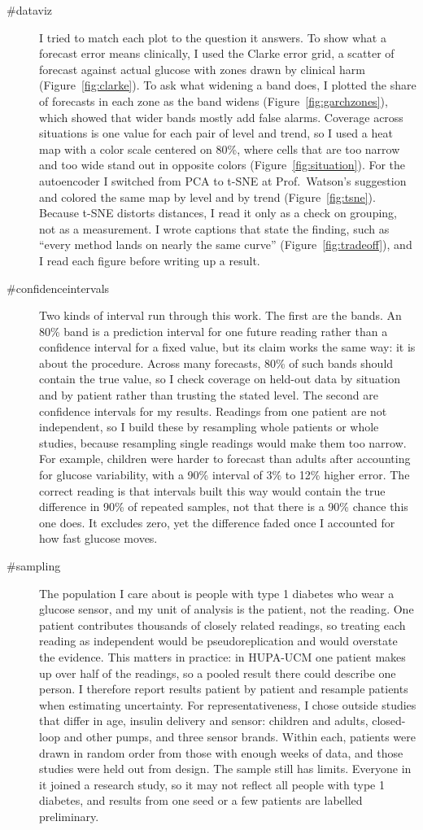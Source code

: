 \begin{description}
\item[\#dataviz] I tried to match each plot to the question it answers. To show what a forecast error means clinically, I used the Clarke error grid, a scatter of forecast against actual glucose with zones drawn by clinical harm (Figure~\ref{fig:clarke}). To ask what widening a band does, I plotted the share of forecasts in each zone as the band widens (Figure~\ref{fig:garchzones}), which showed that wider bands mostly add false alarms. Coverage across situations is one value for each pair of level and trend, so I used a heat map with a color scale centered on 80\%, where cells that are too narrow and too wide stand out in opposite colors (Figure~\ref{fig:situation}). For the autoencoder I switched from PCA to t-SNE at Prof.\ Watson's suggestion and colored the same map by level and by trend (Figure~\ref{fig:tsne}). Because t-SNE distorts distances, I read it only as a check on grouping, not as a measurement. I wrote captions that state the finding, such as ``every method lands on nearly the same curve'' (Figure~\ref{fig:tradeoff}), and I read each figure before writing up a result.
\item[\#confidenceintervals] Two kinds of interval run through this work. The first are the bands. An 80\% band is a prediction interval for one future reading rather than a confidence interval for a fixed value, but its claim works the same way: it is about the procedure. Across many forecasts, 80\% of such bands should contain the true value, so I check coverage on held-out data by situation and by patient rather than trusting the stated level. The second are confidence intervals for my results. Readings from one patient are not independent, so I build these by resampling whole patients or whole studies, because resampling single readings would make them too narrow. For example, children were harder to forecast than adults after accounting for glucose variability, with a 90\% interval of 3\% to 12\% higher error. The correct reading is that intervals built this way would contain the true difference in 90\% of repeated samples, not that there is a 90\% chance this one does. It excludes zero, yet the difference faded once I accounted for how fast glucose moves.
\item[\#sampling] The population I care about is people with type 1 diabetes who wear a glucose sensor, and my unit of analysis is the patient, not the reading. One patient contributes thousands of closely related readings, so treating each reading as independent would be pseudoreplication and would overstate the evidence. This matters in practice: in HUPA-UCM one patient makes up over half of the readings, so a pooled result there could describe one person. I therefore report results patient by patient and resample patients when estimating uncertainty. For representativeness, I chose outside studies that differ in age, insulin delivery and sensor: children and adults, closed-loop and other pumps, and three sensor brands. Within each, patients were drawn in random order from those with enough weeks of data, and those studies were held out from design. The sample still has limits. Everyone in it joined a research study, so it may not reflect all people with type 1 diabetes, and results from one seed or a few patients are labelled preliminary.

\end{description}
